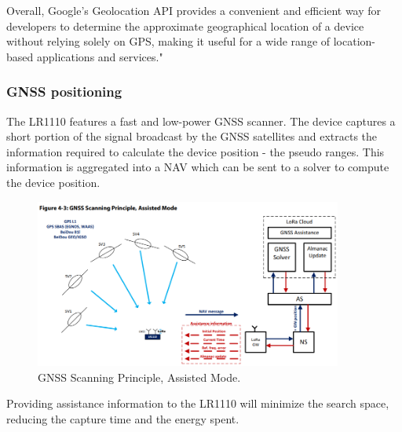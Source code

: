 Overall, Google's Geolocation API provides a convenient and efficient way for developers to determine the approximate geographical location of a device without relying solely on \ac{GPS}, making it useful for a wide range of location-based applications and services."


\subsubsection{GNSS positioning}

The LR1110 features a fast and low-power \ac{GNSS} scanner. The device captures a short portion of the signal broadcast by the \ac{GNSS} satellites and extracts the information required to calculate the device position - the pseudo ranges. This information is aggregated into a \ac{NAV} which can be sent to a solver to compute the device position.

\begin{figure}[H]
    \centering
    \includegraphics[width=0.9\textwidth]{figures/GNSS_scanning.png}
    \caption{GNSS Scanning Principle, Assisted Mode.}
    \label{fig:gnss_scanning}
\end{figure}

Providing assistance information to the LR1110 will minimize the search space, reducing the capture time and the energy spent.

